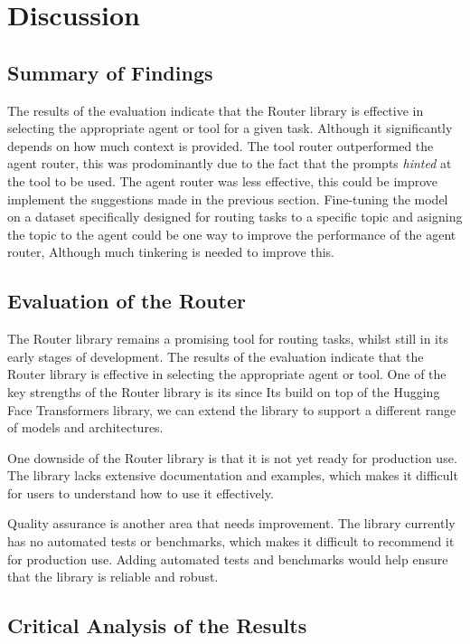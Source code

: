 \chapter{Discussion}
\label{ch:discussion}


\section{Summary of Findings}
\label{sec:summary-of-findings}

The results of the evaluation indicate that the Router library is effective in selecting the appropriate agent or tool for a given task. Although it significantly depends on how much context is provided. The tool router outperformed the agent router, this was prodominantly due to the fact that the prompts \textit{hinted} at the tool to be used. The agent router was less effective, this could be improve implement the suggestions made in the previous section. Fine-tuning the model on a dataset specifically designed for routing tasks to a specific topic and asigning the topic to the agent could be one way to improve the performance of the agent router, Although much tinkering is needed to improve this.


\section{Evaluation of the Router}
\label{sec:evaluation-of-the-router}


The Router library remains a promising tool for routing tasks, whilst still in its early stages of development. The results of the evaluation indicate that the Router library is effective in selecting the appropriate agent or tool. One of the key strengths of the Router library is its since Its build on top of the Hugging Face Transformers library, we can extend the library to support a different range of models and architectures.

One downside of the Router library is that it is not yet ready for production use. The library lacks extensive documentation and examples, which makes it difficult for users to understand how to use it effectively.

Quality assurance is another area that needs improvement. The library currently has no automated tests or benchmarks, which makes it difficult to recommend it for production use. Adding automated tests and benchmarks would help ensure that the library is reliable and robust.


\section{Critical Analysis of the Results}
\label{sec:results-critical-analysis}

